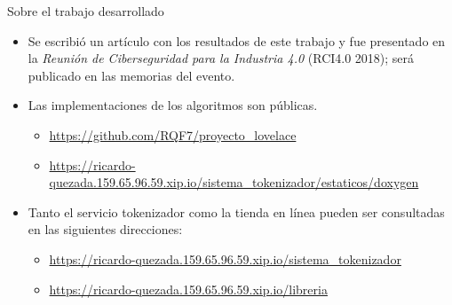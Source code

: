 \begin{frame}{Sobre el trabajo desarrollado}
  \begin{itemize}
    \item Se escribió un artículo con los resultados de este trabajo y fue
      presentado en la \textit{Reunión de Ciberseguridad para la Industria 4.0}
      (RCI4.0 2018); será publicado en las memorias del evento.
    \item Las implementaciones de los algoritmos son públicas.
      \begin{itemize}
        \item \url{https://github.com/RQF7/proyecto_lovelace}
        \item \url{https://ricardo-quezada.159.65.96.59.xip.io/sistema_tokenizador/estaticos/doxygen}
      \end{itemize}
    \item Tanto el servicio tokenizador como la tienda en línea pueden ser
      consultadas en las siguientes direcciones:
      \begin{itemize}
        \item \url{https://ricardo-quezada.159.65.96.59.xip.io/sistema_tokenizador}
        \item \url{https://ricardo-quezada.159.65.96.59.xip.io/libreria}
      \end{itemize}
  \end{itemize}
\end{frame}

